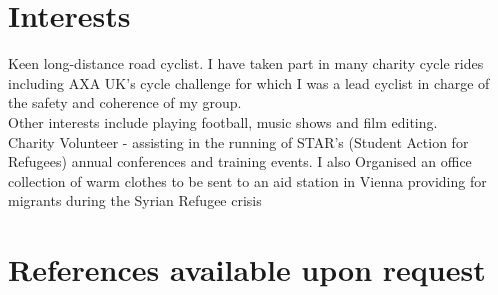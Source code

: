 \documentclass[12pt]{article}
\begin{document}
\section*{Interests}

Keen long-distance road cyclist. I have taken part in many charity cycle rides including AXA UK's cycle challenge for which I was a lead cyclist in charge of the safety and coherence of my group.\\

\noindent Other interests include playing football, music shows and film editing.\\

\noindent Charity Volunteer - assisting in the running of STAR's (Student Action for Refugees) annual conferences and training events.
I also Organised an office collection of warm clothes to be sent to an aid station in Vienna providing for migrants during the Syrian Refugee crisis

\section*{References available upon request}
\end{document}

